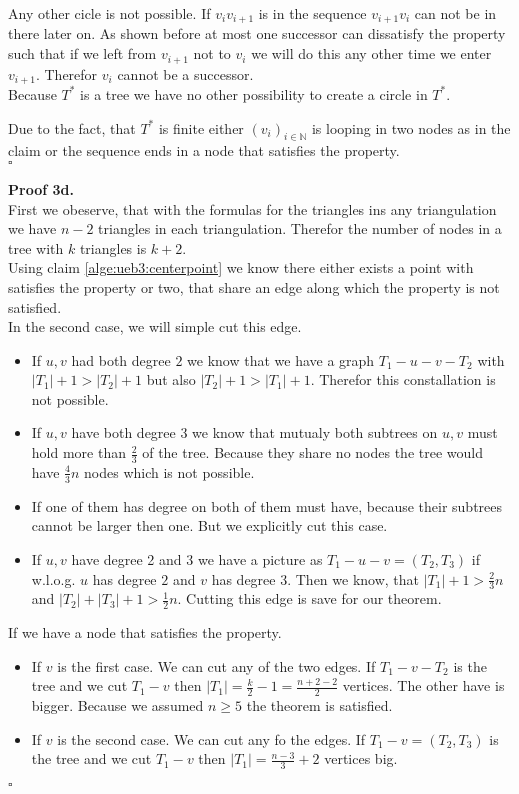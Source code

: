 \documentclass[11pt,a4paper,ngerman]{article}
\begin{document}
Any other cicle is not possible. If $v_{i}v_{i+1}$ is in the sequence $v_{i+1}v_i$ can not be in there later on.
As shown before at most one successor can dissatisfy the property such that if we left from $v_{i+1}$ not to $v_i$ we
will do this any other time we enter $v_{i+1}$. Therefor $v_i$ cannot be a successor.\\

Because $T^*$ is a tree we have no other possibility to create a circle in $T^*$.

Due to the fact, that $T^*$ is finite either $(v_i)_{i \in \mathbb{N}}$ is looping in two nodes as in the claim
or the sequence ends in a node that satisfies the property.\\
\mbox{}\hfill $\square$

\textbf{Proof 3d.}\\
First we obeserve, that with the formulas for the triangles ins any triangulation we have $n-2$ triangles in
each triangulation. Therefor the number of nodes in a tree with $k$ triangles is $k+2$.\\

Using claim \ref{alge:ueb3:centerpoint} we know there either exists a point with satisfies the property or two,
that share an edge along which the property is not satisfied.\\

In the second case, we will simple cut this edge.
\begin{itemize}
     \item If $u,v$ had both degree $2$ we know that we have a graph $T_1 - u - v - T_2$
        with $|T_1| + 1 > |T_2| + 1$ but also $|T_2| + 1 > |T_1| + 1$. Therefor this
        constallation is not possible.
    \item If $u,v$ have both degree $3$ we know that mutualy both subtrees on $u,v$ must hold
        more than $\frac{2}{3}$ of the tree. Because they share no nodes the tree would have $\frac{4}{3}n$ nodes
        which is not possible.
    \item If one of them has degree on both of them must have, because their subtrees cannot be larger then one.
        But we explicitly cut this case.
    \item If $u,v$ have degree 2 and 3 we have a picture as $T_1 - u - v = (T_2, T_3)$ if w.l.o.g. $u$ has degree
        $2$ and $v$ has degree $3$. Then we know, that $|T_1| + 1 > \frac{2}{3}n$ and $|T_2| + |T_3| + 1 > \frac{1}{2} n$.
        Cutting this edge is save for our theorem.
\end{itemize}

If we have a node that satisfies the property.
\begin{itemize}
    \item If $v$ is the first case. We can cut any of the two edges. If $T_1 - v - T_2$ is
        the tree and we cut $T_1 - v$ then $|T_1| = \frac{k}{2} -1 = \frac{n+2 - 2}{2}$ vertices. The other have is bigger.
        Because we assumed $n \geq 5$ the theorem is satisfied.
    \item If $v$ is the second case. We can cut any fo the edges. If $T_1 - v = (T_2, T_3)$ is the
        tree and we cut $T_1 - v$ then $|T_1| = \frac{n-3}{3} + 2$ vertices big.
\end{itemize}
\mbox{}\hfill $\square$
\label{LastPage}
\end{document}
